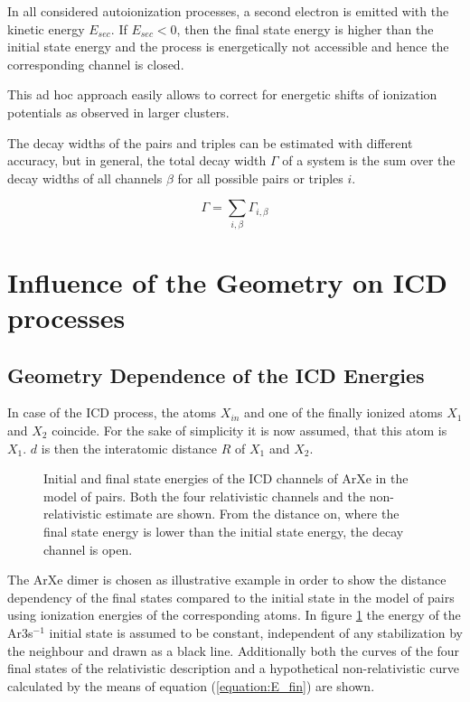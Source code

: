 In all considered autoionization processes, a second electron
is emitted with the kinetic energy $E_{sec}$. If $E_{sec}<0$, then
the final state energy is higher than the initial state energy and the
process is energetically not accessible and hence the corresponding channel
is closed.

This ad hoc approach easily allows to correct for energetic shifts of
ionization potentials as observed in larger clusters.

The decay widths of the pairs and triples can be estimated with
different accuracy, but in general, the total decay width $\Gamma$ of
a system is the sum over the decay widths of all channels $\beta$ for
all possible pairs or triples $i$.

\begin{equation}
  \Gamma = \sum\limits_{i,\beta}\Gamma_{i,\beta}
\end{equation}


\section{Influence of the Geometry on ICD processes}

\subsection{Geometry Dependence of the ICD Energies}
In case of the \ac{ICD} process, the atoms $X_{in}$ and one of
the finally ionized atoms $X_1$ and $X_2$ coincide. For the sake of simplicity
it is now assumed, that this atom is $X_1$. $d$ is then the interatomic distance
$R$ of $X_1$ and $X_2$.

\begin{figure}[h]
 \centering
 
 \caption{Initial and final state energies of the ICD channels of ArXe in the
          model of pairs. Both the four relativistic channels and
          the non-relativistic estimate are shown. From the distance on, where
          the final state energy is lower than the initial state energy, the
          decay channel is open.}
 \label{figure:ArXe_energy_curves_unshifted}
\end{figure}

The ArXe dimer is chosen as illustrative example in order to show the distance
dependency of the final states compared to the initial state
in the model of pairs using
ionization energies of the corresponding atoms.
In figure \ref{figure:ArXe_energy_curves_unshifted} the energy of
the Ar3s$^{-1}$ initial
state is assumed to be constant, independent of any stabilization by the
neighbour and drawn as a black line. Additionally both the
curves of the four final states of the relativistic description and
a hypothetical non-relativistic curve calculated by the means of
equation (\ref{equation:E_fin}) are shown.

